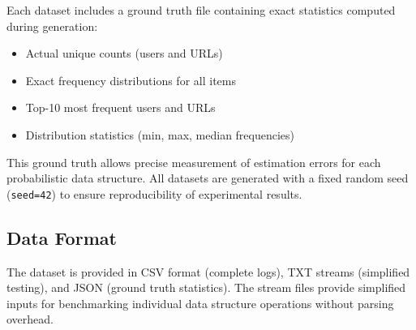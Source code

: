 Each dataset includes a ground truth file containing exact statistics computed during generation:

\begin{itemize}
    \item Actual unique counts (users and URLs)
    \item Exact frequency distributions for all items
    \item Top-10 most frequent users and URLs
    \item Distribution statistics (min, max, median frequencies)
\end{itemize}

This ground truth allows precise measurement of estimation errors for each probabilistic data structure. All datasets are generated with a fixed random seed (\texttt{seed=42}) to ensure reproducibility of experimental results.

\subsection{Data Format}

The dataset is provided in CSV format (complete logs), TXT streams (simplified testing), and JSON (ground truth statistics). The stream files provide simplified inputs for benchmarking individual data structure operations without parsing overhead.
